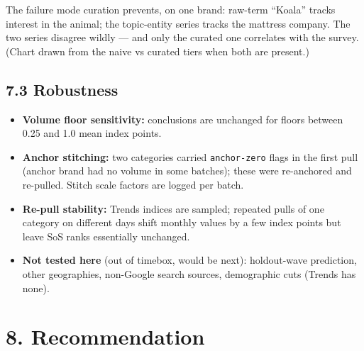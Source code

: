\documentclass[
]{article}
\providecommand{\tightlist}{%
  \setlength{\itemsep}{0pt}\setlength{\parskip}{0pt}}
\begin{document}
The failure mode curation prevents, on one brand: raw-term ``Koala''
tracks interest in the animal; the topic-entity series tracks the
mattress company. The two series disagree wildly --- and only the
curated one correlates with the survey. (Chart drawn from the naive vs
curated tiers when both are present.)

\hypertarget{robustness}{%
\subsection{7.3 Robustness}\label{robustness}}

\begin{itemize}
\tightlist
\item
  \textbf{Volume floor sensitivity:} conclusions are unchanged for
  floors between 0.25 and 1.0 mean index points.
\item
  \textbf{Anchor stitching:} two categories carried \texttt{anchor-zero}
  flags in the first pull (anchor brand had no volume in some batches);
  these were re-anchored and re-pulled. Stitch scale factors are logged
  per batch.
\item
  \textbf{Re-pull stability:} Trends indices are sampled; repeated pulls
  of one category on different days shift monthly values by a few index
  points but leave SoS ranks essentially unchanged.
\item
  \textbf{Not tested here} (out of timebox, would be next): holdout-wave
  prediction, other geographies, non-Google search sources, demographic
  cuts (Trends has none).
\end{itemize}

\hypertarget{recommendation}{%
\section{8. Recommendation}\label{recommendation}}
\end{document}
